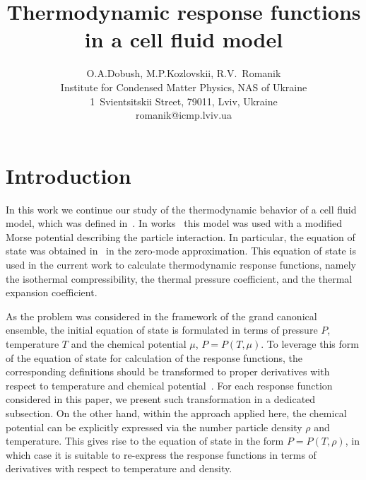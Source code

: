 \documentclass[12pt]{article}
\title{Thermodynamic response functions in a cell fluid model}
\author{O.A.Dobush, M.P.Kozlovskii, R.V.~Romanik
	\\ \small Institute for Condensed Matter Physics, NAS of Ukraine 
	\\ \small 1~Svientsitskii Street, 79011, Lviv, Ukraine 
	\\ \small romanik@icmp.lviv.ua}
\begin{document}
	
	\maketitle
	
	
	\section{Introduction}
	
	In this work we continue our study of the thermodynamic behavior of a cell fluid model, which was defined in~\cite{KozitskyKozlovskiiDobush2018book,KozitskyKozlovskiiDobush2020}. In works~\cite{KozlovskiiDobush2020,PylyukDobush2020,PylyukEtAlJML2023,PylyukKozlovskiiDobushUJP2023b} this model was used with a modified Morse potential describing the particle interaction. In particular, the equation of state was obtained in~\cite{KozlovskiiDobush2020} in the zero-mode approximation. This equation of state is used in the current work to calculate thermodynamic response functions, namely the isothermal compressibility, the thermal pressure coefficient, and the thermal expansion coefficient. 
	
	As the problem was considered in the framework of the grand canonical ensemble, the initial equation of state is formulated in terms of pressure $P$, temperature $T$ and the chemical potential $\mu$, $P = P(T,\mu)$. To leverage this form of the equation of state for calculation of the response functions, the corresponding definitions should be transformed to proper derivatives with respect to temperature and chemical potential~\cite{StrokerMeier2021}. For each response function considered in this paper, we present such transformation in a dedicated subsection. On the other hand, within the approach applied here, the chemical potential can be explicitly expressed via the number particle density $\rho$ and temperature. This gives rise to the equation of state in the form $P = P(T, \rho)$, in which case it is suitable to re-express the response functions in terms of derivatives with respect to temperature and density.
	
\end{document}

